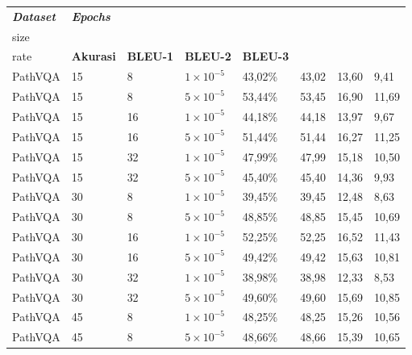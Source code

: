 \begin{longtable}[c]{|l|l|l|l|l|l|l|l|}
\hline
\textit{\textbf{Dataset}} &
  \textit{\textbf{Epochs}} &
  \textit{\textbf{\begin{tabular}[c]{@{}l@{}}Batch \\ size\end{tabular}}} &
  \textit{\textbf{\begin{tabular}[c]{@{}l@{}}Learning\\  rate\end{tabular}}} &
  \textbf{Akurasi} &
  \textbf{BLEU-1} &
  \textbf{BLEU-2} &
  \textbf{BLEU-3} \\ \hline
\endfirsthead
%
\endhead
%
PathVQA & 15 & 8  & $1 \times 10^{-5}$ & 43,02\% & 43,02 & 13,60 & 9,41  \\ \hline
PathVQA & 15 & 8  & $5 \times 10^{-5}$ & 53,44\% & 53,45 & 16,90 & 11,69 \\ \hline
PathVQA & 15 & 16 & $1 \times 10^{-5}$ & 44,18\% & 44,18 & 13,97 & 9,67  \\ \hline
PathVQA & 15 & 16 & $5 \times 10^{-5}$ & 51,44\% & 51,44 & 16,27 & 11,25 \\ \hline
PathVQA & 15 & 32 & $1 \times 10^{-5}$ & 47,99\% & 47,99 & 15,18 & 10,50 \\ \hline
PathVQA & 15 & 32 & $5 \times 10^{-5}$ & 45,40\% & 45,40 & 14,36 & 9,93  \\ \hline
PathVQA & 30 & 8  & $1 \times 10^{-5}$ & 39,45\% & 39,45 & 12,48 & 8,63  \\ \hline
PathVQA & 30 & 8  & $5 \times 10^{-5}$ & 48,85\% & 48,85 & 15,45 & 10,69 \\ \hline
PathVQA & 30 & 16 & $1 \times 10^{-5}$ & 52,25\% & 52,25 & 16,52 & 11,43 \\ \hline
PathVQA & 30 & 16 & $5 \times 10^{-5}$ & 49,42\% & 49,42 & 15,63 & 10,81 \\ \hline
PathVQA & 30 & 32 & $1 \times 10^{-5}$ & 38,98\% & 38,98 & 12,33 & 8,53  \\ \hline
PathVQA & 30 & 32 & $5 \times 10^{-5}$ & 49,60\% & 49,60 & 15,69 & 10,85 \\ \hline
PathVQA & 45 & 8  & $1 \times 10^{-5}$ & 48,25\% & 48,25 & 15,26 & 10,56 \\ \hline
PathVQA & 45 & 8  & $5 \times 10^{-5}$ & 48,66\% & 48,66 & 15,39 & 10,65 \\ \hline

\end{longtable}
